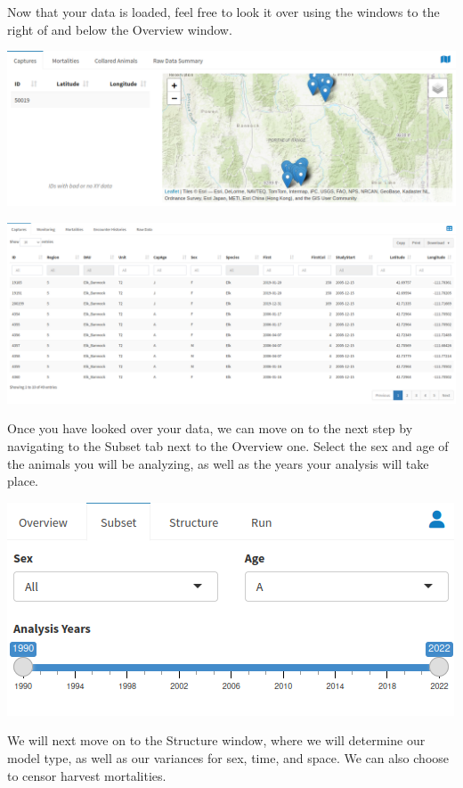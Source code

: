\documentclass[
]{book}
\begin{document}
Now that your data is loaded, feel free to look it over using the windows to the right of and below the Overview window.

\includegraphics{./www/surv_walk3.png}

\includegraphics{./www/surv_walk4.png}

Once you have looked over your data, we can move on to the next step by navigating to the Subset tab next to the Overview one. Select the sex and age of the animals you will be analyzing, as well as the years your analysis will take place.

\includegraphics{./www/surv_walk5.png}

We will next move on to the Structure window, where we will determine our model type, as well as our variances for sex, time, and space. We can also choose to censor harvest mortalities.
\end{document}
